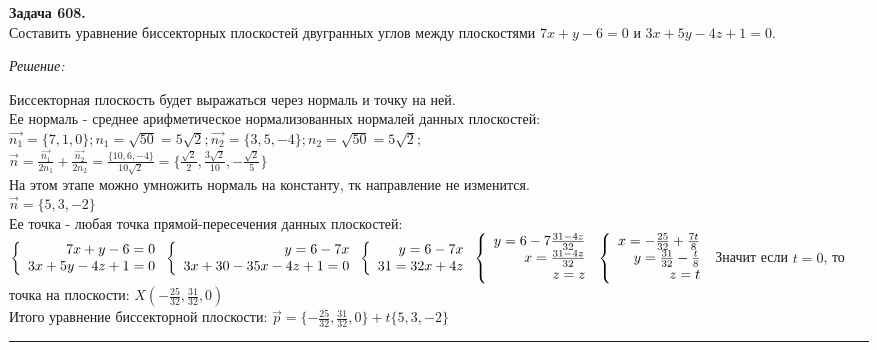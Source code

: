 \documentclass[a4paper, 12pt]{article}
\newenvironment{problem}[2][Задача]
    { \begin{mdframed}[backgroundcolor=gray!10] \textbf{#1 #2.} \\}
    {  \end{mdframed}}
\newenvironment{solution}
    {\textit{Решение: }}
    {\noindent\rule{7in}{1.5pt}}
\begin{document}
\begin{problem}{608}
Составить уравнение биссекторных плоскостей двугранных углов между плоскостями
$7x+y-6=0$ и $3x+5y-4z+1=0$.
\end{problem}
\begin{solution}

Биссекторная плоскость будет выражаться через нормаль и точку на ней. \\
Ее нормаль - среднее арифметическое нормализованных нормалей данных плоскостей: \\
$
\overrightarrow{n_1} = \{7, 1, 0\}; n_1 = \sqrt{50} = 5\sqrt2;
\overrightarrow{n_2} = \{3, 5, -4\}; n_2 = \sqrt{50} = 5\sqrt2;
$ \\
$
\vec{n} = \frac{\overrightarrow{n_1}}{2n_1} + \frac{\overrightarrow{n_2}}{2n_2} =
\frac{\{10, 6, -4\}}{10\sqrt2} = \{\frac{\sqrt2}{2}, \frac{3\sqrt2}{10}, -\frac{\sqrt2}{5}\}
$ \\
На этом этапе можно умножить нормаль на константу, тк направление не изменится. \\
$\vec{n} = \{5, 3, -2\}$ \\
Ее точка - любая точка прямой-пересечения данных плоскостей: \\
$
\left\{
  \begin{array}{r}
    7x + y - 6 = 0 \\
    3x + 5y - 4z + 1 = 0
  \end{array}
\right.
\left\{
  \begin{array}{r}
    y = 6 - 7x \\
    3x + 30 - 35x - 4z + 1 = 0
  \end{array}
\right.
\left\{
  \begin{array}{r}
    y = 6 - 7x \\
    31 = 32x + 4z
  \end{array}
\right.
\left\{
  \begin{array}{r}
    y = 6 - 7\frac{31 - 4z}{32} \\
    x = \frac{31 - 4z}{32} \\
    z = z
  \end{array}
\right.
\\
\left\{
  \begin{array}{r}
    x = -\frac{25}{32} + \frac{7t}{8} \\
    y = \frac{31}{32} - \frac{t}{8} \\
    z = t
  \end{array}
\right.
$
Значит если $t = 0$, то точка на плоскости: $X(-\frac{25}{32}, \frac{31}{32}, 0)$ \\

Итого уравнение биссекторной плоскости: $\vec{p} = \{-\frac{25}{32}, \frac{31}{32}, 0\} + t\{5, 3, -2\}$


\end{solution}


\end{document}
